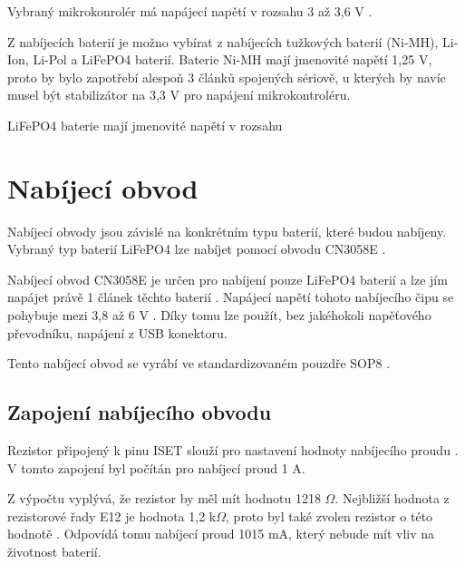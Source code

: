 Vybraný mikrokonrolér má napájecí napětí v rozsahu 3 až 3,6 V \cite{ESP_C3_dtsh}. 

Z nabíjecích baterií je možno vybírat z nabíjecích tužkových baterií (Ni-MH), Li-Ion, Li-Pol a LiFePO4 baterií.
Baterie Ni-MH mají jmenovité napětí 1,25 V, proto by bylo zapotřebí alespoň 3 článků spojených sériově, u kterých by navíc musel být stabilizátor
na 3,3 V pro napájení mikrokontroléru. %


LiFePO4 baterie mají jmenovité napětí v rozsahu %



\section{Nabíjecí obvod}
Nabíjecí obvody jsou závislé na konkrétním typu baterií, které budou nabíjeny. Vybraný typ baterií LiFePO4 lze nabíjet pomocí obvodu CN3058E \cite{charger_dtsh}. 

Nabíjecí obvod CN3058E je určen pro nabíjení pouze LiFePO4 baterií a lze jím napájet právě 1 článek těchto baterií \cite{charger_dtsh}. Napájecí napětí tohoto 
nabíjecího čipu se pohybuje mezi 3,8 až 6 V \cite{charger_dtsh}. Díky tomu lze použít, bez jakéhokoli napěťového převodníku, napájení z USB konektoru. 



Tento nabíjecí obvod se vyrábí ve standardizovaném pouzdře SOP8 \cite{charger_dtsh}.

\subsection{Zapojení nabíjecího obvodu}
Rezistor připojený k pinu ISET slouží pro nastavení hodnoty nabíjecího proudu \cite{charger_dtsh}. V tomto zapojení byl počítán pro nabíjecí proud 1 A. 


Z výpočtu vyplývá, že rezistor by měl mít hodnotu 1218 $\Omega$. Nejbližší hodnota z rezistorové řady E12 je hodnota 1,2 k$\Omega$, proto byl také zvolen rezistor 
o této hodnotě \cite{rezistorova_rada}. Odpovídá tomu nabíjecí proud 1015 mA, který nebude mít vliv na životnost baterií. 


